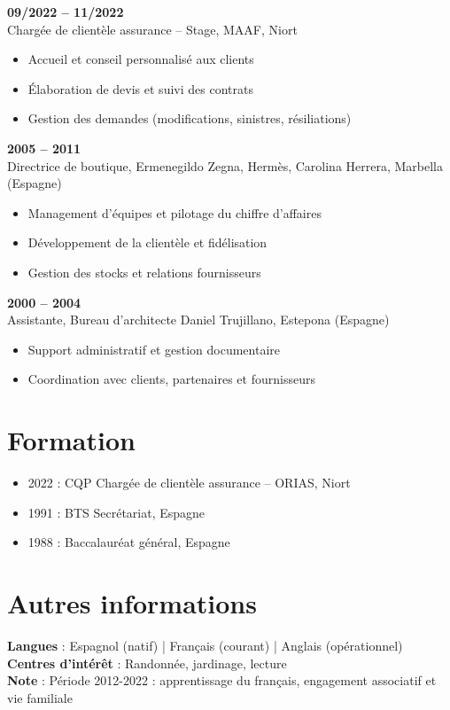 \documentclass[11pt,a4paper]{simplecv}
\begin{document}
\textbf{09/2022 -- 11/2022} \\
Chargée de clientèle assurance -- Stage, MAAF, Niort
\begin{itemize}[leftmargin=*]
  \item Accueil et conseil personnalisé aux clients
  \item Élaboration de devis et suivi des contrats
  \item Gestion des demandes (modifications, sinistres, résiliations)
\end{itemize}

\textbf{2005 -- 2011} \\
Directrice de boutique, Ermenegildo Zegna, Hermès, Carolina Herrera, Marbella (Espagne)
\begin{itemize}[leftmargin=*]
  \item Management d’équipes et pilotage du chiffre d’affaires
  \item Développement de la clientèle et fidélisation
  \item Gestion des stocks et relations fournisseurs
\end{itemize}

\textbf{2000 -- 2004} \\
Assistante, Bureau d’architecte Daniel Trujillano, Estepona (Espagne)
\begin{itemize}[leftmargin=*]
  \item Support administratif et gestion documentaire
  \item Coordination avec clients, partenaires et fournisseurs
\end{itemize}

\section*{Formation}
\begin{itemize}[leftmargin=*]
  \item 2022 : CQP Chargée de clientèle assurance -- ORIAS, Niort
  \item 1991 : BTS Secrétariat, Espagne
  \item 1988 : Baccalauréat général, Espagne
\end{itemize}

\section*{Autres informations}
\textbf{Langues} : Espagnol (natif) | Français (courant) | Anglais (opérationnel)\\
\textbf{Centres d’intérêt} : Randonnée, jardinage, lecture\\
\textbf{Note} : Période 2012-2022 : apprentissage du français, engagement associatif et vie familiale
\end{document}
